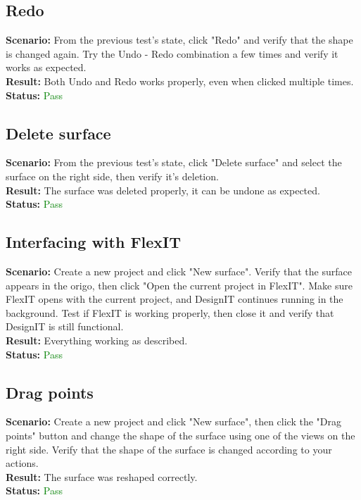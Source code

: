 \documentclass[a4paper, 11pt, article]{report}
\begin{document}
\subsection{Redo}

\noindent \textbf{Scenario:} From the previous test's state, click "Redo" and verify that the shape is changed again. Try the Undo - Redo combination a few times and verify it works as expected.
\\
\noindent \textbf{Result:} Both Undo and Redo works properly, even when clicked multiple times.
\\
\noindent \textbf{Status:} \textcolor{green}{Pass}

\subsection{Delete surface}

\noindent \textbf{Scenario:} From the previous test's state, click "Delete surface" and select the surface on the right side, then verify it's deletion.
\\
\noindent \textbf{Result:} The surface was deleted properly, it can be undone as expected.
\\
\noindent \textbf{Status:} \textcolor{green}{Pass}

\subsection{Interfacing with FlexIT}

\noindent \textbf{Scenario:} Create a new project and click "New surface". Verify that the surface appears in the origo, then click "Open the current project in FlexIT". Make sure FlexIT opens with the current project, and DesignIT continues running in the background. Test if FlexIT is working properly, then close it and verify that DesignIT is still functional.
\\
\noindent \textbf{Result:} Everything working as described.
\\
\noindent \textbf{Status:} \textcolor{green}{Pass}

\subsection{Drag points}

\noindent \textbf{Scenario:} Create a new project and click "New surface", then click the "Drag points" button and change the shape of the surface using one of the views on the right side. Verify that the shape of the surface is changed according to your actions.
\\
\noindent \textbf{Result:} The surface was reshaped correctly.
\\
\noindent \textbf{Status:} \textcolor{green}{Pass}
\end{document}
